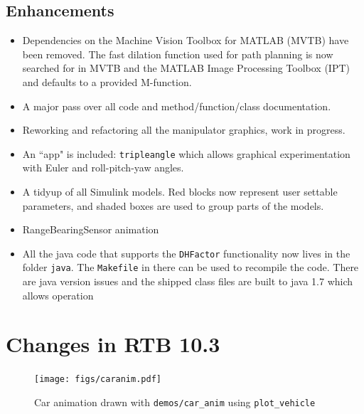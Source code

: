 \documentclass[a4paper,twoside]{report}
\begin{document}
\subsection{Enhancements}
\begin{itemize}
\item Dependencies on the Machine Vision Toolbox for MATLAB (MVTB) have been removed.  The fast dilation function used for path planning is now searched for in MVTB and the MATLAB Image Processing Toolbox (IPT) and defaults to a provided M-function.
\item A major pass over all code and method/function/class documentation.
\item Reworking and refactoring all the manipulator graphics, work in progress.
\item An ``app" is included: \texttt{tripleangle} which allows graphical experimentation with Euler and roll-pitch-yaw angles.
\item A tidyup of all Simulink models.  Red blocks now represent user settable parameters, and shaded boxes are used to group parts of the models.
\item RangeBearingSensor animation
\item All the java code that supports the \texttt{DHFactor} functionality now lives in the folder \texttt{java}.  The \texttt{Makefile} in there can be used
to recompile the code.  There are java version issues and the shipped class files are built to java 1.7 which allows operation
\end{itemize}

\section{Changes in RTB 10.3}
\begin{figure}[b]
\centering
\texttt{[image: figs/caranim.pdf]} 
\caption{Car animation drawn with \texttt{demos/car\_anim} using \texttt{plot\_vehicle}}\label{fig:caranim}
\end{figure}
\end{document}
